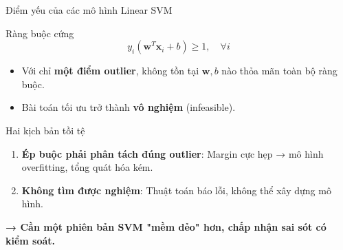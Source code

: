 \begin{frame}{Điểm yếu của các mô hình Linear SVM}
  \begin{block}{Ràng buộc cứng}
    \[
    y_i(\bm{w}^T \bm{x}_i + b) \geq 1, \quad \forall i
    \]
  \end{block}
  \begin{itemize}
    \item Với chỉ \textbf{một điểm outlier}, không tồn tại $\bm{w}, b$ nào thỏa mãn toàn bộ ràng buộc.
    \item Bài toán tối ưu trở thành \textbf{vô nghiệm} (infeasible).
  \end{itemize}

  \begin{alertblock}{Hai kịch bản tồi tệ}
    \begin{enumerate}
      \item \textbf{Ép buộc phải phân tách đúng outlier}: Margin cực hẹp → mô hình overfitting, tổng quát hóa kém.
      \item \textbf{Không tìm được nghiệm}: Thuật toán báo lỗi, không thể xây dựng mô hình.
    \end{enumerate}
  \end{alertblock}

  \vspace{0.3cm}
  \centering
  \textbf{→ Cần một phiên bản SVM "mềm dẻo" hơn, chấp nhận sai sót có kiểm soát.}
\end{frame}


